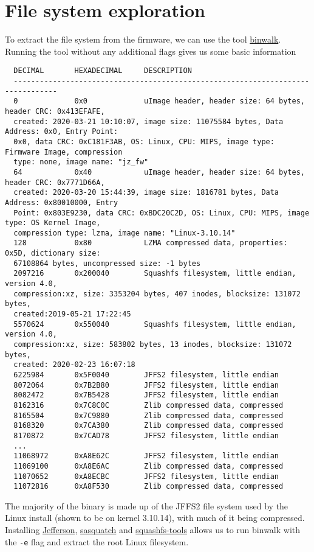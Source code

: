 \documentclass[a4paper, 11pt]{article}
\begin{document}
\section{File system exploration}
To extract the file system from the firmware, we can use the tool \href{https://github.com/ReFirmLabs/binwalk}{binwalk}. Running the tool without any additional flags gives us some basic information
\begin{verbatim}
  DECIMAL       HEXADECIMAL     DESCRIPTION
  --------------------------------------------------------------------------------
  0             0x0             uImage header, header size: 64 bytes, header CRC: 0x413EFAFE,
  created: 2020-03-21 10:10:07, image size: 11075584 bytes, Data Address: 0x0, Entry Point:
  0x0, data CRC: 0xC181F3AB, OS: Linux, CPU: MIPS, image type: Firmware Image, compression 
  type: none, image name: "jz_fw"
  64            0x40            uImage header, header size: 64 bytes, header CRC: 0x7771D66A,
  created: 2020-03-20 15:44:39, image size: 1816781 bytes, Data Address: 0x80010000, Entry
  Point: 0x803E9230, data CRC: 0xBDC20C2D, OS: Linux, CPU: MIPS, image type: OS Kernel Image,
  compression type: lzma, image name: "Linux-3.10.14"
  128           0x80            LZMA compressed data, properties: 0x5D, dictionary size:
  67108864 bytes, uncompressed size: -1 bytes
  2097216       0x200040        Squashfs filesystem, little endian, version 4.0,
  compression:xz, size: 3353204 bytes, 407 inodes, blocksize: 131072 bytes,
  created:2019-05-21 17:22:45
  5570624       0x550040        Squashfs filesystem, little endian, version 4.0,
  compression:xz, size: 583802 bytes, 13 inodes, blocksize: 131072 bytes,
  created: 2020-02-23 16:07:18
  6225984       0x5F0040        JFFS2 filesystem, little endian
  8072064       0x7B2B80        JFFS2 filesystem, little endian
  8082472       0x7B5428        JFFS2 filesystem, little endian
  8162316       0x7C8C0C        Zlib compressed data, compressed
  8165504       0x7C9880        Zlib compressed data, compressed
  8168320       0x7CA380        Zlib compressed data, compressed
  8170872       0x7CAD78        JFFS2 filesystem, little endian
  ...
  11068972      0xA8E62C        JFFS2 filesystem, little endian
  11069100      0xA8E6AC        Zlib compressed data, compressed
  11070652      0xA8ECBC        JFFS2 filesystem, little endian
  11072816      0xA8F530        Zlib compressed data, compressed
\end{verbatim}
The majority of the binary is made up of the JFFS2 file system used by the Linux install (shown to be on kernel 3.10.14), with much of it being compressed. Installing \href{https://github.com/onekey-sec/jefferson/}{Jefferson}, \href{https://github.com/devttys0/sasquatch}{sasquatch} and \href{https://github.com/plougher/squashfs-tools}{squashfs-tools} allows us to run binwalk with the \verb|-e| flag and extract the root Linux filesystem.
\end{document}

